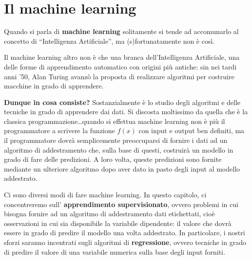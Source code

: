 \documentclass[a4paper, 11pt, oneside]{report}
\begin{document}
    \chapter{Il machine learning}
        Quando si parla di \textbf{machine learning} solitamente si tende ad accomunarlo al concetto di ``Intelligenza Artificiale'',
        ma (s)fortunatamente non è così.
        \par \noindent Il machine learning altro non è che una branca dell'Intelligenza Artificiale, una delle forme
        di apprendimento automatico con origini più antiche: sin nei tardi anni '50, Alan Turing avanzò la proposta
        di realizzare algoritmi per costruire macchine in grado di apprendere.
        \par \noindent \textbf{Dunque in cosa consiste?} Sostanzialmente è lo studio degli algoritmi e delle tecniche in
        grado di apprendere dai dati.
        Si discosta moltissimo da quella che è la classica programmazione\ldots quando si effettua machine learning non
        è più il programmatore a scrivere la funzione $f(x)$ con input e output ben definiti, ma il
        programmatore dovrà semplicemente preoccuparsi di fornire i dati ad un algoritmo di addestramento che, sulla base
        di questi, costruirà un modello in grado di fare delle predizioni. A loro volta, queste predizioni sono fornite
        mediante un ulteriore algoritmo dopo aver dato in pasto degli input al modello addestrato.
        \\
        \par \noindent Ci sono diversi modi di fare machine learning.
        In questo capitolo, ci concentreremo sull'
        \textbf{apprendimento supervisionato}, ovvero problemi in cui bisogna fornire ad un algoritmo di addestramento
        dati etichettati, cioè osservazioni in cui sia disponibile la variabile dipendente: il valore che
        dovrà essere in grado di predire il modello una volta addestrato.
        In particolare, i nostri sforzi saranno incentrati sugli algoritmi di \textbf{regressione}, ovvero tecniche in grado
        di predire il valore di una variabile numerica sulla base degli input forniti.

            \bigskip
\end{document}
